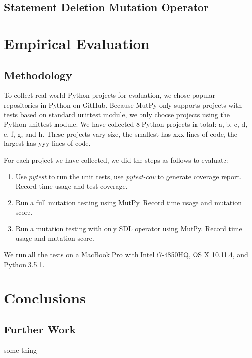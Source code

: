 \documentclass[12pt]{article}
\begin{document}
\subsection{Statement Deletion Mutation Operator}

\section{Empirical Evaluation}

\subsection{Methodology}

To collect real world Python projects for evaluation, we chose popular repositories in Python on GitHub. Because MutPy only supports projects with tests based on standard unittest module, we only choose projects using the Python unittest module. We have collected 8 Python projects in total: a, b, c, d, e, f, g, and h. These projects vary size, the smallest has xxx lines of code, the largest has yyy lines of code.

For each project we have collected, we did the steps as follows to evaluate:

\begin{enumerate}
  \item Use \emph{pytest} \cite{pytest} to run the unit tests, use \emph{pytest-cov} \cite{pytest-cov} to generate coverage report. Record time usage and test coverage.
  \item Run a full mutation testing using MutPy. Record time usage and mutation score.
  \item Run a mutation testing with only SDL operator using MutPy. Record time usage and mutation score.
\end{enumerate}

We run all the tests on a MacBook Pro with Intel i7-4850HQ, OS X 10.11.4, and Python 3.5.1.

\section{Conclusions}

\subsection{Further Work}
some thing

\begin{appendices}
\end{appendices}



\end{document}
